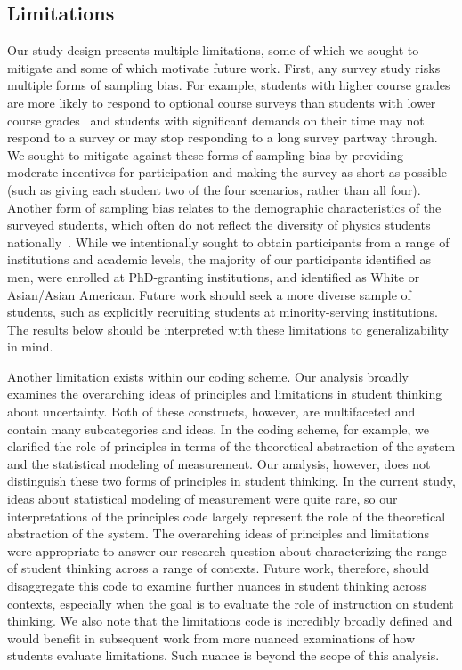 \documentclass[english,aps,prstper,reprint,showpacs,longbibliography,superscriptaddress,nofootinbib]{revtex4-2}
\begin{document}
\subsection{Limitations}

Our study design presents multiple limitations, some of which we sought to mitigate and some of which motivate future work. First, any survey study risks multiple forms of sampling bias. For example, students with higher course grades are more likely to respond to optional course surveys than students with lower course grades~\cite{Nissen2019} and students with significant demands on their time may not respond to a survey or may stop responding to a long survey partway through. We sought to mitigate against these forms of sampling bias by providing moderate incentives for participation and making the survey as short as possible (such as giving each student two of the four scenarios, rather than all four). Another form of sampling bias relates to the demographic characteristics of the surveyed students, which often do not reflect the diversity of physics students nationally~\cite{Kanim2020}. While we intentionally sought to obtain participants from a range of institutions and academic levels, the majority of our participants identified as men, were enrolled at PhD-granting institutions, and identified as White or Asian/Asian American. Future work should seek a more diverse sample of students, such as explicitly recruiting students at minority-serving institutions. The results below should be interpreted with these limitations to generalizability in mind.

Another limitation exists within our coding scheme. Our analysis broadly examines the overarching ideas of principles and limitations in student thinking about uncertainty. Both of these constructs, however, are multifaceted and contain many subcategories and ideas. In the coding scheme, for example, we clarified the role of principles in terms of the theoretical abstraction of the system and the statistical modeling of measurement. Our analysis, however, does not distinguish these two forms of principles in student thinking. In the current study, ideas about statistical modeling of measurement were quite rare, so our interpretations of the principles code largely represent the role of the theoretical abstraction of the system. The overarching ideas of principles and limitations were appropriate to answer our research question about characterizing the range of student thinking across a range of contexts. Future work, therefore, should disaggregate this code to examine further nuances in student thinking across contexts, especially when the goal is to evaluate the role of instruction on student thinking. We also note that the limitations code is incredibly broadly defined and would benefit in subsequent work from more nuanced examinations of how students evaluate limitations. Such nuance is beyond the scope of this analysis.
\end{document}
